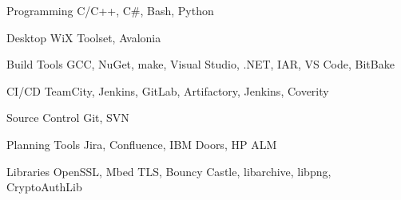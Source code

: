 

\begin{cvskills}


\cvskill
{Programming} %
{C/C++, C\#, Bash, Python} %


\cvskill
{Desktop} %
{WiX Toolset, Avalonia} %


\cvskill
{Build Tools} %
{GCC, NuGet, make, Visual Studio, .NET, IAR, VS Code, BitBake} %


\cvskill
{CI/CD} %
{TeamCity, Jenkins, GitLab, Artifactory, Jenkins, Coverity} %


\cvskill
{Source Control} %
{Git, SVN} %


\cvskill
{Planning Tools} %
{Jira, Confluence, IBM Doors, HP ALM} %


\cvskill
{Libraries} %
{OpenSSL, Mbed TLS, Bouncy Castle, libarchive, libpng, CryptoAuthLib} %

\end{cvskills}